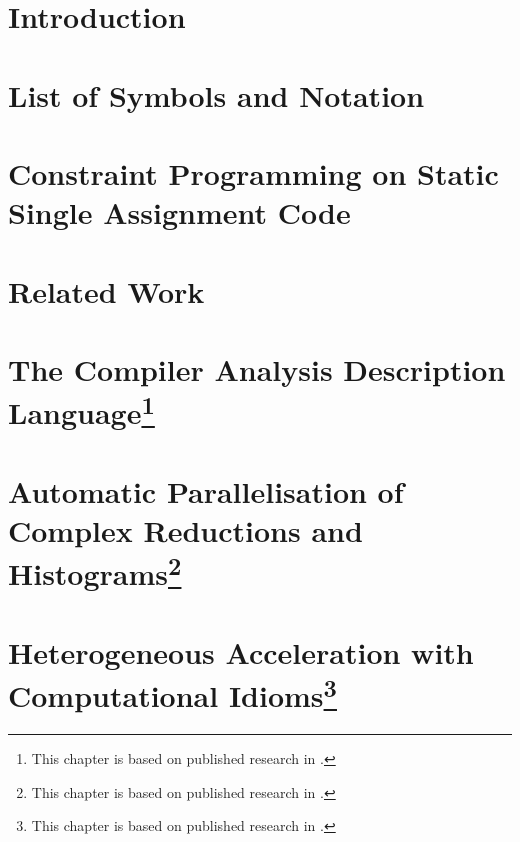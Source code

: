 \documentclass[phd,icsa,twoside,logo,11pt]{infthesis}
\begin{document}
\chapter{Introduction}
    \label{chapter:introduction}
    

\makeatletter
\@openrightfalse
\makeatother
\chapter*{}
\makeatletter
\@openrighttrue
\makeatother

\makeatletter
\@openrightfalse
\makeatother
\chapter*{List of Symbols and Notation}
    
\makeatletter
\@openrighttrue
\makeatother

\chapter{Constraint Programming on Static Single Assignment Code}
    \label{chapter:theory}
    

\chapter{Related Work}
    \label{chapter:literature}
    

\chapter[The Compiler Analysis Description Language]
        {The Compiler Analysis Description
         Language\footnote{This chapter is based on published research in
                           \citet{Ginsbach:2018:CDS:3178372.3179515}.}}
    \label{chapter:candl}
    

\chapter[Automatic Parallelisation of Complex Reductions and Histograms]
        {Automatic Parallelisation of Complex Reductions and
         Histograms\footnote{This chapter is based on published research in
                            \citet{ginsbach2017discovery}.}}
    \label{chapter:reductions}
    

\chapter[Heterogeneous Acceleration with Computational Idioms]
        {Heterogeneous Acceleration with Computational
         Idioms\footnote{This chapter is based on published research in
                         \citet{Ginsbach:2018:AML:3173162.3173182}.}}
    \label{chapter:idioms}
    
\end{document}
